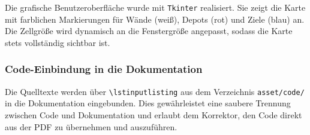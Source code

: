 Die grafische Benutzeroberfläche wurde mit \texttt{Tkinter} realisiert. Sie zeigt die Karte mit farblichen Markierungen für Wände (weiß), Depots (rot) und Ziele (blau) an. Die Zellgröße wird dynamisch an die Fenstergröße angepasst, sodass die Karte stets vollständig sichtbar ist.

\subsubsection{Code-Einbindung in die Dokumentation}

Die Quelltexte werden über \texttt{\textbackslash lstinputlisting} aus dem Verzeichnis \texttt{asset/code/} in die Dokumentation eingebunden. Dies gewährleistet eine saubere Trennung zwischen Code und Dokumentation und erlaubt dem Korrektor, den Code direkt aus der PDF zu übernehmen und auszuführen.



